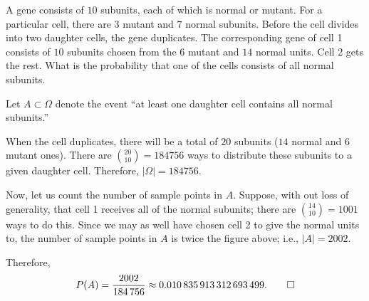 \begin{problem}[Handout 1, \# 7]
  A gene consists of \(10\) subunits, each of which is normal or
  mutant. For a particular cell, there are \(3\) mutant and \(7\) normal
  subunits. Before the cell divides into two daughter cells, the gene
  duplicates. The corresponding gene of cell 1 consists of \(10\) subunits
  chosen from the \(6\) mutant and \(14\) normal units. Cell 2 gets the
  rest. What is the probability that one of the cells consists of all
  normal subunits.
\end{problem}
\begin{solution*}
  Let \(A\subset\Omega\) denote the event ``at least one daughter cell
  contains all normal subunits.''

  When the cell duplicates, there will be a total of \(20\) subunits
  (\(14\) normal and \(6\) mutant ones). There are
  \(\binom{20}{10}=\num{184756}\) ways to distribute these subunits to a
  given daughter cell. Therefore, \(|\Omega|=\num{184756}\).

  Now, let us count the number of sample points in \(A\). Suppose, with out
  loss of generality, that cell 1 receives all of the normal subunits;
  there are \(\binom{14}{10}=1001\) ways to do this. Since we may as well have
  chosen cell 2 to give the normal units to, the number of sample points in
  \(A\) is twice the figure above; i.e., \(|A|=2002\).

  Therefore,
  \[
    P(A)=\frac{2002}{\num{184756}}\approx\num{0.010835913312693499}.\qedhere
  \]
\end{solution*}

